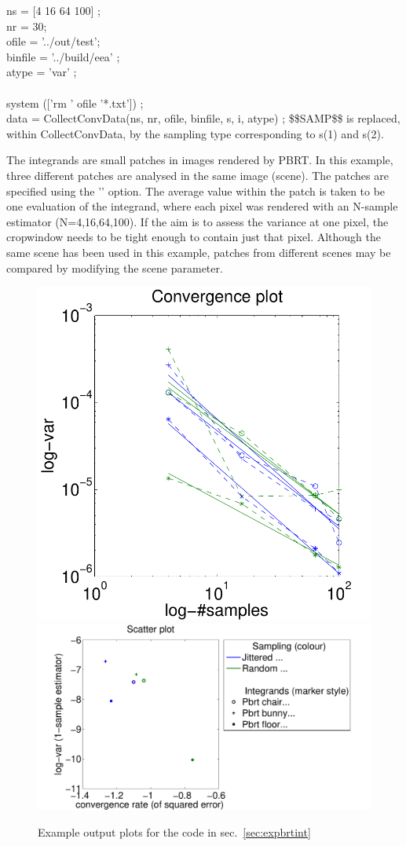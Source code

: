 \begin{tcolorbox}
ns = {[4 16 64 100]} ;\\
nr =  30;\\
ofile = '../out/test';\\
binfile = '../build/eea' ;\\
atype = 'var' ;\\
\\
system (['rm ' ofile '*.txt']) ;\\
data = CollectConvData(ns, nr, ofile, binfile, s, i, atype) ;
\tcblower
  \$\$SAMP\$\$ is replaced, within CollectConvData, by the sampling type corresponding to s(1) and s(2).
\end{tcolorbox}
The integrands are small patches in images rendered by PBRT. In this example, three different patches are analysed in the same image (scene). The patches are specified using the '' option. The average value within the patch is taken to be one evaluation of the integrand, where each pixel was rendered with an N-sample estimator (N=4,16,64,100). If the aim is to assess the variance at one pixel, the cropwindow needs to be tight enough to contain just that pixel. Although the same scene has been used in this example, patches from different scenes may be compared by modifying the scene parameter.
\begin{figure}[htbp]
\includegraphics[width=0.36\linewidth]{figs/pbrt-convs.pdf} 
\includegraphics[width=0.64\linewidth]{figs/pbrt-scatter.pdf}
\caption{\label{fig:expbrtint} Example output plots for the code in sec.~\ref{sec:expbrtint}}
\end{figure}

